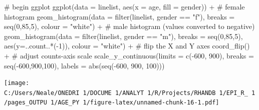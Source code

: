 \documentclass[
]{article}
\newenvironment{Shaded}{\begin{snugshade}}{\end{snugshade}}
\newcommand{\CommentTok}[1]{\textcolor[rgb]{0.50,0.62,0.50}{#1}}
\newcommand{\DataTypeTok}[1]{\textcolor[rgb]{0.87,0.87,0.75}{#1}}
\newcommand{\DecValTok}[1]{\textcolor[rgb]{0.86,0.86,0.80}{#1}}
\newcommand{\KeywordTok}[1]{\textcolor[rgb]{0.94,0.87,0.69}{#1}}
\newcommand{\NormalTok}[1]{\textcolor[rgb]{0.80,0.80,0.80}{#1}}
\newcommand{\OperatorTok}[1]{\textcolor[rgb]{0.94,0.94,0.82}{#1}}
\newcommand{\StringTok}[1]{\textcolor[rgb]{0.80,0.58,0.58}{#1}}
\begin{document}
\begin{Shaded}
\begin{Highlighting}[]
  \CommentTok{\# begin ggplot}
  \KeywordTok{ggplot}\NormalTok{(}\DataTypeTok{data =}\NormalTok{ linelist, }\KeywordTok{aes}\NormalTok{(}\DataTypeTok{x =}\NormalTok{ age, }\DataTypeTok{fill =}\NormalTok{ gender)) }\OperatorTok{+}
\StringTok{  }
\StringTok{  }\CommentTok{\# female histogram}
\StringTok{  }\KeywordTok{geom\_histogram}\NormalTok{(}\DataTypeTok{data =} \KeywordTok{filter}\NormalTok{(linelist, gender }\OperatorTok{==}\StringTok{ "f"}\NormalTok{),}
                 \DataTypeTok{breaks =} \KeywordTok{seq}\NormalTok{(}\DecValTok{0}\NormalTok{,}\DecValTok{85}\NormalTok{,}\DecValTok{5}\NormalTok{),}
                 \DataTypeTok{colour =} \StringTok{"white"}\NormalTok{) }\OperatorTok{+}
\StringTok{  }
\StringTok{  }\CommentTok{\# male histogram (values converted to negative)}
\StringTok{  }\KeywordTok{geom\_histogram}\NormalTok{(}\DataTypeTok{data =} \KeywordTok{filter}\NormalTok{(linelist, gender }\OperatorTok{==}\StringTok{ "m"}\NormalTok{),}
                 \DataTypeTok{breaks =} \KeywordTok{seq}\NormalTok{(}\DecValTok{0}\NormalTok{,}\DecValTok{85}\NormalTok{,}\DecValTok{5}\NormalTok{),}
                 \KeywordTok{aes}\NormalTok{(}\DataTypeTok{y=}\NormalTok{..count..}\OperatorTok{*}\NormalTok{(}\OperatorTok{{-}}\DecValTok{1}\NormalTok{)),}
                 \DataTypeTok{colour =} \StringTok{"white"}\NormalTok{) }\OperatorTok{+}
\StringTok{  }
\StringTok{  }\CommentTok{\# flip the X and Y axes}
\StringTok{  }\KeywordTok{coord\_flip}\NormalTok{() }\OperatorTok{+}
\StringTok{  }
\StringTok{  }\CommentTok{\# adjust counts{-}axis scale}
\StringTok{  }\KeywordTok{scale\_y\_continuous}\NormalTok{(}\DataTypeTok{limits =} \KeywordTok{c}\NormalTok{(}\OperatorTok{{-}}\DecValTok{600}\NormalTok{, }\DecValTok{900}\NormalTok{),}
                     \DataTypeTok{breaks =} \KeywordTok{seq}\NormalTok{(}\OperatorTok{{-}}\DecValTok{600}\NormalTok{,}\DecValTok{900}\NormalTok{,}\DecValTok{100}\NormalTok{),}
                     \DataTypeTok{labels =} \KeywordTok{abs}\NormalTok{(}\KeywordTok{seq}\NormalTok{(}\OperatorTok{{-}}\DecValTok{600}\NormalTok{, }\DecValTok{900}\NormalTok{, }\DecValTok{100}\NormalTok{)))}
\end{Highlighting}
\end{Shaded}

\texttt{[image: C:/Users/Neale/ONEDRI~1/DOCUME~1/ANALYT~1/R/Projects/RHANDB~1/EPI\_R\_~1/pages\_OUTPU~1/AGE\_PY~1/figure-latex/unnamed-chunk-16-1.pdf]}
\end{document}
